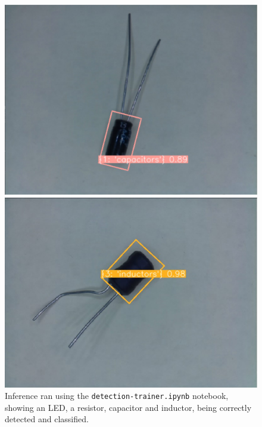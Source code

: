 \begin{figure}[H]
\begin{minipage}{0.49\textwidth}
    \includegraphics[width=\textwidth]{imgs/cv/2024-05-21_13-04-10_python.jpg}
  \end{minipage}
  \hfill
  \begin{minipage}{0.49\textwidth}
    \centering
    \includegraphics[width=\textwidth]{imgs/cv/2024-06-10_20-47-34_python.jpg}
  \end{minipage}
  \caption{Inference ran using the \texttt{detection-trainer.ipynb} notebook, showing an LED, a resistor, capacitor and inductor, being correctly detected and classified.}
  \label{fig:inference-components}
\end{figure}

